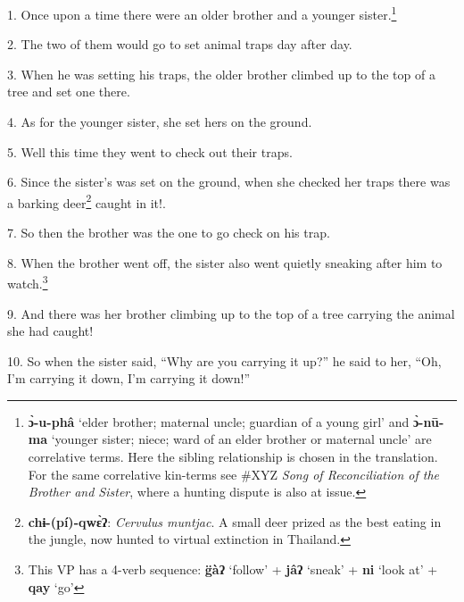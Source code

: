 \setcounter{footnote}{0}

1. Once upon a time there were an older brother and a younger sister.\footnote{\textbf{ɔ̀-u-phâ} `elder brother; maternal uncle; guardian of a young girl' and \textbf{ɔ̀-nū-ma} `younger sister; niece; ward of an elder brother or maternal uncle' are correlative terms. Here the sibling relationship is chosen in the translation. For the same correlative kin-terms see \#XYZ \textit{Song of Reconciliation of the Brother and Sister}, where a hunting dispute is also at issue.}

2. The two of them would go to set animal traps day after day.

3. When he was setting his traps, the older brother climbed up to the top of a
tree and set one there.

4. As for the younger sister, she set hers on the ground.

5. Well this time they went to check out their traps.

6. Since the sister's was set on the ground, when she checked her traps there was
a barking deer\footnote{\textbf{chɨ-(pí)-qwɛ̀ʔ}: \textit{Cervulus muntjac}. A small deer prized as the best eating in the jungle, now hunted to virtual extinction in Thailand.} caught in it!.

7. So then the brother was the one to go check on his trap.

8. When the brother went off, the sister also went quietly sneaking after him to
watch.\footnote{This VP has a 4-verb sequence: \textbf{g̈àʔ} `follow' + \textbf{jâʔ} `sneak' + \textbf{ni} `look at' + \textbf{qay} `go'}

9. And there was her brother climbing up to the top of a tree carrying the animal
she had caught!

10. So when the sister said, ``Why are you carrying it up?'' he said to her, ``Oh,
I'm carrying it down, I'm carrying it down!''


